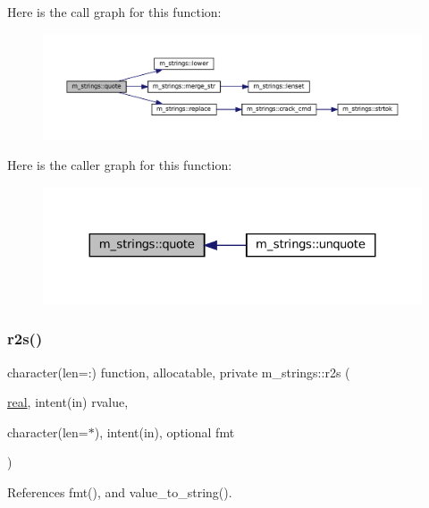 Here is the call graph for this function\+:\nopagebreak
\begin{figure}[H]
\begin{center}
\leavevmode
\includegraphics[width=350pt]{namespacem__strings_a3596a4ec755ac897a1dbc0b225d5266a_cgraph}
\end{center}
\end{figure}
Here is the caller graph for this function\+:\nopagebreak
\begin{figure}[H]
\begin{center}
\leavevmode
\includegraphics[width=324pt]{namespacem__strings_a3596a4ec755ac897a1dbc0b225d5266a_icgraph}
\end{center}
\end{figure}
\mbox{\label{namespacem__strings_ab67ea90007b3f2eb308a5fe8d1cf0df1}} 
\subsubsection{\texorpdfstring{r2s()}{r2s()}}
{\footnotesize\ttfamily character(len=\+:) function, allocatable, private m\+\_\+strings\+::r2s (\begin{DoxyParamCaption}\item[{\mbox{\hyperlink{interfacem__strings_1_1real}{real}}, intent(in)}]{rvalue,  }\item[{character(len=$\ast$), intent(in), optional}]{fmt }\end{DoxyParamCaption})\hspace{0.3cm}{\ttfamily [private]}}



References fmt(), and value\+\_\+to\+\_\+string().

